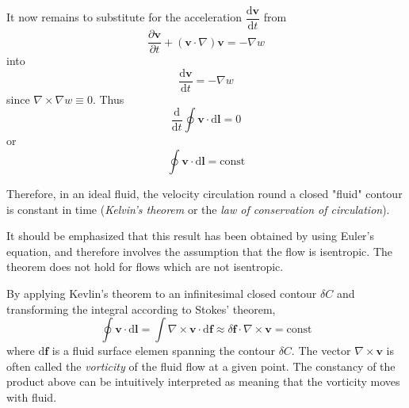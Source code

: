 \documentclass[conference]{IEEEtran}
\theoremstyle{definition}
\theoremstyle{remark}
\begin{document}
    It now remains to substitute for the acceleration $\dfrac{\mathrm{d} \mathbf{v}}{\mathrm{d} t}$ from
    \[
        \dfrac{\partial \mathbf{v}}{\partial t} + (\mathbf{v} \cdot \nabla) \mathbf{v} = -\nabla w
    \]
    into 
    \[
        \dfrac{\mathrm{d} \mathbf{v}}{\mathrm{d} t} = -\nabla w
    \]
    since $\nabla \times \nabla w \equiv 0$. Thus
    \[
        \dfrac{\mathrm{d}}{\mathrm{d} t} \oint \mathbf{v} \cdot \mathrm{d} \mathbf{l} = 0
    \]
    or
    \begin{equation}
        \oint \mathbf{v} \cdot \mathrm{d} \mathbf{l} = \text{const}
    \end{equation}
    
    Therefore, in an ideal fluid, the velocity circulation round a closed "fluid" contour is constant in time (\emph{Kelvin's theorem} or the \emph{law of conservation of circulation}).

    It should be emphasized that this result has been obtained by using Euler's equation, and therefore involves the assumption that the flow is isentropic. The theorem does not hold for flows which are not isentropic.

    By applying Kevlin's theorem to an infinitesimal closed contour $\delta C$ and transforming the integral according to Stokes' theorem,
    \begin{equation}
        \oint \mathbf{v} \cdot \mathrm{d} \mathbf{l} = \int \nabla \times \mathbf{v} \cdot \mathrm{d} \mathbf{f} \approx \delta \mathbf{f} \cdot \nabla \times \mathbf{v} = \text{const}
    \end{equation}
    where $\mathrm{d} \mathbf{f}$ is a fluid surface elemen spanning the contour $\delta C$. The vector $\nabla \times \mathbf{v}$ is often called the \emph{vorticity} of the fluid flow at a given point. The constancy of the product above can be intuitively interpreted as meaning that the vorticity moves with fluid.
\end{document}
